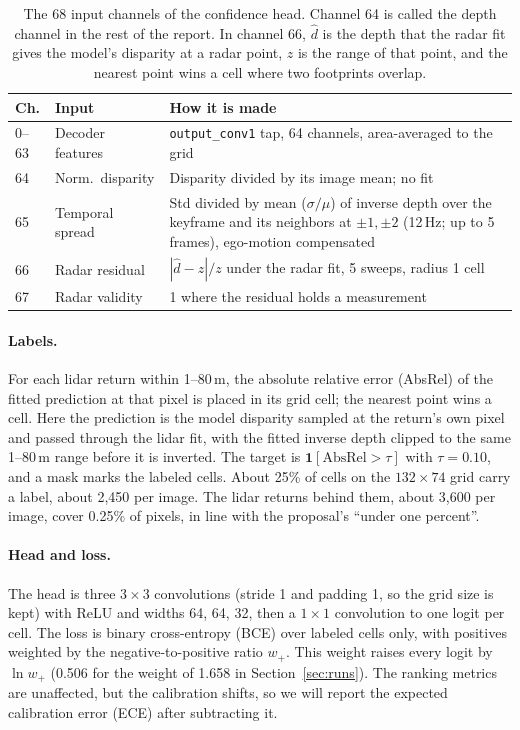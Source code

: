 \begin{table}[t]
  \centering
  \small
  \setlength{\tabcolsep}{4pt}
  \begin{tabular}{@{}l l p{3.2cm}@{}}
    \toprule
    \textbf{Ch.} & \textbf{Input} & \textbf{How it is made} \\
    \midrule
    0--63 & Decoder features & \texttt{output\_conv1} tap, 64 channels, area-averaged to the grid \\
    64 & Norm.\ disparity & Disparity divided by its image mean; no fit \\
    65 & Temporal spread & Std divided by mean ($\sigma/\mu$) of inverse depth over the keyframe and its neighbors at $\pm1, \pm2$ (12\,Hz; up to 5 frames), ego-motion compensated \\
    66 & Radar residual & $|\hat d - z| / z$ under the radar fit, 5 sweeps, radius 1 cell \\
    67 & Radar validity & 1 where the residual holds a measurement \\
    \bottomrule
  \end{tabular}
  \caption{The 68 input channels of the confidence head. Channel 64 is called the depth channel in the rest of the report. In channel 66, $\hat d$ is the depth that the radar fit gives the model's disparity at a radar point, $z$ is the range of that point, and the nearest point wins a cell where two footprints overlap.}
  \label{tab:inputs}
\end{table}

\paragraph{Labels.} For each lidar return within 1--80\,m, the absolute relative error (AbsRel) of the fitted prediction at that pixel is placed in its grid cell; the nearest point wins a cell. Here the prediction is the model disparity sampled at the return's own pixel and passed through the lidar fit, with the fitted inverse depth clipped to the same 1--80\,m range before it is inverted. The target is $\mathbf{1}[\mathrm{AbsRel} > \tau]$ with $\tau = 0.10$, and a mask marks the labeled cells. About 25\% of cells on the $132 \times 74$ grid carry a label, about 2,450 per image. The lidar returns behind them, about 3,600 per image, cover 0.25\% of pixels, in line with the proposal's ``under one percent''.

\paragraph{Head and loss.} The head is three $3 \times 3$ convolutions (stride 1 and padding 1, so the grid size is kept) with ReLU and widths 64, 64, 32, then a $1 \times 1$ convolution to one logit per cell. The loss is binary cross-entropy (BCE) over labeled cells only, with positives weighted by the negative-to-positive ratio $w_+$. This weight raises every logit by $\ln w_+$ (0.506 for the weight of 1.658 in Section~\ref{sec:runs}). The ranking metrics are unaffected, but the calibration shifts, so we will report the expected calibration error (ECE) after subtracting it.

